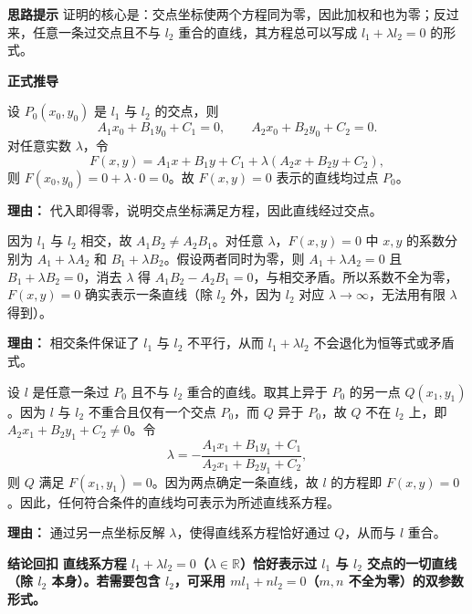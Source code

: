 \begin{proofbox}
	\textbf{\textcolor{CProof}{思路提示}}
	证明的核心是：交点坐标使两个方程同为零，因此加权和也为零；反过来，任意一条过交点且不与 $l_2$ 重合的直线，其方程总可以写成 $l_1+\lambda l_2=0$ 的形式。

	\medskip
	\textbf{\textcolor{CProof}{正式推导}}
	\begin{description}[style=nextline, leftmargin=2.8em, labelsep=0.5em, itemsep=0.55em]
		\item[\textbf{步骤一（验证恒过定点）：}]
			设 $P_0(x_0,y_0)$ 是 $l_1$ 与 $l_2$ 的交点，则
			\[
				A_1x_0+B_1y_0+C_1=0,
				\qquad
				A_2x_0+B_2y_0+C_2=0.
			\]
			对任意实数 $\lambda$，令
			\[
				F(x,y)=A_1x+B_1y+C_1+\lambda(A_2x+B_2y+C_2),
			\]
			则 $F(x_0,y_0)=0+ \lambda \cdot 0=0$。故 $F(x,y)=0$ 表示的直线均过点 $P_0$。
			\par\textbf{理由：} 代入即得零，说明交点坐标满足方程，因此直线经过交点。
		\item[\textbf{步骤二（确保为一次方程）：}]
			因为 $l_1$ 与 $l_2$ 相交，故 $A_1B_2\neq A_2B_1$。对任意 $\lambda$，$F(x,y)=0$ 中 $x,y$ 的系数分别为 $A_1+\lambda A_2$ 和 $B_1+\lambda B_2$。假设两者同时为零，则 $A_1+\lambda A_2=0$ 且 $B_1+\lambda B_2=0$，消去 $\lambda$ 得 $A_1B_2-A_2B_1=0$，与相交矛盾。所以系数不全为零，$F(x,y)=0$ 确实表示一条直线（除 $l_2$ 外，因为 $l_2$ 对应 $\lambda\to\infty$，无法用有限 $\lambda$ 得到）。
			\par\textbf{理由：} 相交条件保证了 $l_1$ 与 $l_2$ 不平行，从而 $l_1+\lambda l_2$ 不会退化为恒等式或矛盾式。
		\item[\textbf{步骤三（覆盖所有过交点直线）：}]
			设 $l$ 是任意一条过 $P_0$ 且不与 $l_2$ 重合的直线。取其上异于 $P_0$ 的另一点 $Q(x_1,y_1)$。因为 $l$ 与 $l_2$ 不重合且仅有一个交点 $P_0$，而 $Q$ 异于 $P_0$，故 $Q$ 不在 $l_2$ 上，即 $A_2x_1+B_2y_1+C_2\neq0$。令
			\[
				\lambda = -\frac{A_1x_1+B_1y_1+C_1}{A_2x_1+B_2y_1+C_2},
			\]
			则 $Q$ 满足 $F(x_1,y_1)=0$。因为两点确定一条直线，故 $l$ 的方程即 $F(x,y)=0$。因此，任何符合条件的直线均可表示为所述直线系方程。
			\par\textbf{理由：} 通过另一点坐标反解 $\lambda$，使得直线系方程恰好通过 $Q$，从而与 $l$ 重合。
	\end{description}

	\medskip
	\textbf{\textcolor{CProof}{结论回扣}}
	\textbf{直线系方程 $l_1+\lambda l_2=0$（$\lambda\in\mathbb{R}$）恰好表示过 $l_1$ 与 $l_2$ 交点的一切直线（除 $l_2$ 本身）。若需要包含 $l_2$，可采用 $m l_1 + n l_2=0$（$m,n$ 不全为零）的双参数形式。}
\end{proofbox}
